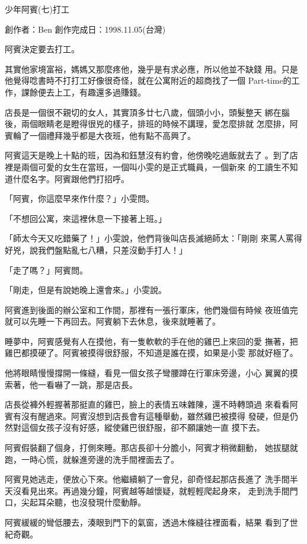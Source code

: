 



少年阿賓(七)打工

創作者：Ben
創作完成日：1998.11.05(台灣)


阿賓決定要去打工。

其實他家境富裕，媽媽又那麼疼他，幾乎是有求必應，所以他並不缺錢
用。只是他覺得唸書時不打打工好像很奇怪，就在公寓附近的超商找了一個
Part-time的工作，課餘便去上工，有趣還多過賺錢。

店長是一個很不親切的女人，其實頂多廿七八歲，個頭小小，頭髮整天
綁在腦後，兩個眼睛老是瞪得很兇的樣子，排班的時候不講理，愛怎麼排就
怎麼排，阿賓輪了一個禮拜幾乎都是大夜班，他有點不高興了。

阿賓這天是晚上十點的班，因為和鈺慧沒有約會，他傍晚吃過飯就去了
。到了店裡是兩個可愛的女生在當班，一個叫小雯的是正式職員，一個新來
的工讀生不知道什麼名字。阿賓跟他們打招呼。

「阿賓，你這麼早來作什麼？」小雯問。

「不想回公寓，來這裡休息一下接著上班。」

「師太今天又吃錯藥了！」小雯說，他們背後叫店長滅絕師太：「剛剛
來罵人罵得好兇，說我們盤點亂七八糟，只差沒動手打人！」

「走了嗎？」阿賓問。

「剛走，但是有說她晚上還會來。」小雯說。

阿賓進到後面的辦公室和工作間，那裡有一張行軍床，他們幾個有時候
夜班值完就可以先睡一下再回去。阿賓躺下去休息，後來就睡著了。

睡夢中，阿賓感覺有人在摸他，有一隻軟軟的手在他的雞巴上來回的愛
撫著，把雞巴都摸硬了。阿賓被摸得很舒服，不知道是誰在摸，如果是小雯
那就好極了。

他將眼睛慢慢撐開一條縫，看見一個女孩子彎腰蹲在行軍床旁邊，小心
翼翼的摸索著，他一看嚇了一跳，那是店長。

店長從褲外輕握著那挺直的雞巴，臉上的表情五味雜陳，還不時轉頭過
來看看阿賓有沒有醒過來。阿賓沒想到店長會有這種舉動，雖然雞巴被摸得
發硬，但是仍然對這個女孩子沒有好感，縱使雞巴很舒服，卻不願讓她一直
摸下去。

阿賓假裝翻了個身，打側來睡。那店長卻十分膽小，阿賓才稍微翻動，
她拔腿就跑，一時心慌，就躲進旁邊的洗手間裡面去了。

阿賓見她逃走，便放心下來。他繼續躺了一會兒，卻奇怪起那店長進了
洗手間半天沒看見出來。再過幾分鐘，阿賓越等越懷疑，就輕輕爬起身來，
走到洗手間門口，尖起耳朵聽，也沒發現什麼動靜。

阿賓緩緩的彎低腰去，湊眼到門下的氣窗，透過木條縫往裡面看，結果
看到了世紀奇觀。

